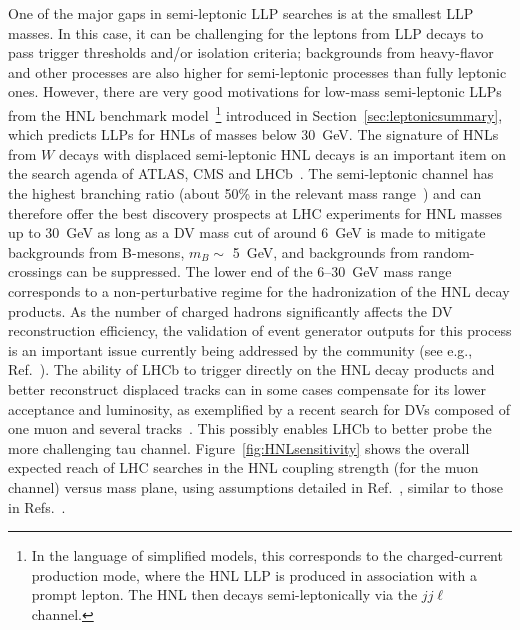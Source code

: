 One of the major gaps in semi-leptonic LLP searches is at the smallest LLP masses. In this case, it can be challenging for the leptons from LLP decays to pass trigger thresholds and/or isolation criteria; backgrounds from heavy-flavor and other processes are also higher for semi-leptonic processes than fully leptonic ones. However, there are very good motivations for low-mass semi-leptonic LLPs from the HNL benchmark model~\footnote{In the language of simplified models, this corresponds to the charged-current production mode, where the HNL LLP is produced in association with a prompt lepton. The HNL then decays semi-leptonically via the $jj\ell$ channel.} introduced in Section~\ref{sec:leptonicsummary}, which predicts LLPs for HNLs of masses below 30~GeV. The signature of HNLs from $W$ decays with displaced semi-leptonic HNL decays is an important item on the search agenda of ATLAS, CMS and LHCb~\cite{Helo:2013esa,Izaguirre:2015pga,Mermod2017,Antusch2017,Nemevsek:2018bbt,Cottin:2018kmq}. The semi-leptonic channel has the highest branching ratio (about 50\% in the relevant mass range~\cite{Gronau1984}) and can therefore offer the best discovery prospects at LHC experiments for HNL masses up to 30~GeV as long as a DV mass cut of around 6~GeV is made to mitigate backgrounds from B-mesons, $m_B \sim$ 5~GeV, and backgrounds from random-crossings can be suppressed. The lower end of the 6--30~GeV mass range corresponds to a non-perturbative regime for the hadronization of the HNL decay products. As the number of charged hadrons significantly affects the DV reconstruction efficiency, the validation of event generator outputs for this process is an important issue currently being addressed by the community (see e.g., Ref.~\cite{Cottin:2018kmq}). The ability of LHCb to trigger directly on the HNL decay products and better reconstruct displaced tracks can in some cases compensate for its lower acceptance and luminosity, as exemplified by a recent search for DVs composed of one muon and several tracks~\cite{Aaij:2016xmb,Antusch2017}. This possibly enables LHCb to better probe the more challenging tau channel. Figure~\ref{fig:HNLsensitivity} shows the overall expected reach of LHC searches in the HNL coupling strength (for the muon channel) versus mass plane, using assumptions detailed in Ref.~\cite{Mermod2017}, similar to those in Refs.~\cite{Helo:2013esa,Izaguirre:2015pga}.

